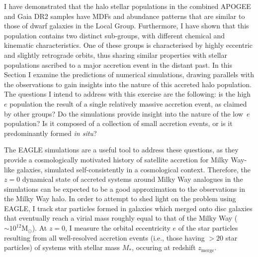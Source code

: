 I have demonstrated that the halo stellar populations in the
combined APOGEE and Gaia DR2 samples have MDFs and abundance
patterns that are similar to those of dwarf galaxies in the Local
Group. Furthermore, I have shown that this population contains
two distinct sub-groups, with different chemical and kinematic
characteristics. One of these groups is characterised by highly
eccentric and slightly retrograde orbits, thus sharing similar
properties with stellar populations ascribed to a major accretion
event in the distant past.  In this Section I examine the predictions
of numerical simulations, drawing parallels with the observations
to gain insights into the nature of this accreted halo
population.  The questions I intend to address with this exercise
are the following: is the high~$e$ population the result of a single
relatively massive accretion event, as claimed by other groups?  Do
the simulations provide insight into the nature of the low~$e$
population? Is it composed of a collection of small accretion events,
or is it predominantly formed {\it in situ}? 

The EAGLE simulations are a useful tool to address these questions,
as they provide a  cosmologically motivated history of satellite
accretion for Milky Way-like galaxies, simulated self-consistently
in a cosmological context.  Therefore,  the  $z=0$ dynamical
state of accreted systems around Milky Way analogues in the simulations
can be expected to be a good approximation to the observations in the Milky Way
halo. In order to attempt to shed light on the problem using EAGLE, I track star particles formed in galaxies which merged onto disc galaxies that eventually reach a
virial mass roughly equal to that of the Milky Way ($\sim 10^{12}
\mathrm{M_{\odot}}$). At $z=0$, I measure the orbital eccentricity
$e$ of the star particles resulting from all well-resolved accretion
events (i.e., those having $>20$ star particles) of 
systems with stellar mass $M_*$, occuring at redshift $z_\mathrm{merge}$.

